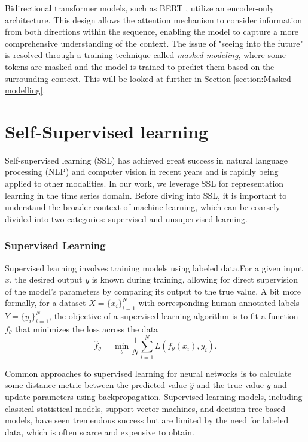 \documentclass[../../thesis.tex]{subfiles}
\begin{document}
Bidirectional transformer models, such as BERT \cite{devlin2019bert}, utilize an encoder-only architecture. This design allows the attention mechanism to consider information from both directions within the sequence, enabling the model to capture a more comprehensive understanding of the context. The issue of "seeing into the future" is resolved through a training technique called \textit{masked modeling}, where some tokens are masked and the model is trained to predict them based on the surrounding context. This will be looked at further in Section \ref{section:Masked modelling}.

\section{Self-Supervised learning}

Self-supervised learning (SSL) has achieved great success in natural language processing (NLP) and computer vision in recent years and is rapidly being applied to other modalities. In our work, we leverage SSL for representation learning in the time series domain. Before diving into SSL, it is important to understand the broader context of machine learning, which can be coarsely divided into two categories: supervised and unsupervised learning.
\newline

\subsubsection*{Supervised Learning}

Supervised learning involves training models using labeled data.For a given input $x$, the desired output $y$ is known during training, allowing for direct supervision of the model's parameters by comparing its output to the true value. A bit more formally, for a dataset $X = \{x_i\}_{i=1}^N$ with corresponding human-annotated labels $Y = \{y_i\}_{i=1}^N$, the objective of a supervised learning algorithm is to fit a function $f_\theta$ that minimizes the loss across the data
\begin{equation}
    \widehat{f}_\theta = \min_\theta \frac{1}{N} \sum_{i=1}^N L(f_\theta(x_i),y_i).
\end{equation}

Common approaches to supervised learning for neural networks is to calculate some distance metric between the predicted value $\widehat{y}$ and the true value $y$ and update parameters using backpropagation.\newline
Supervised learning models, including classical statistical models, support vector machines, and decision tree-based models, have seen tremendous success but are limited by the need for labeled data, which is often scarce and expensive to obtain.
\end{document}
